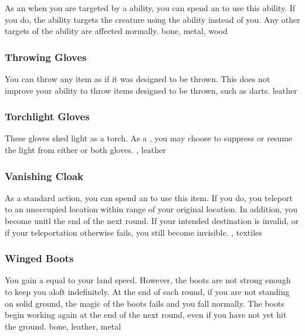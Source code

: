 As an  when you are targeted by a   ability, you can spend an  to use this ability.
If you do, the ability targets the creature using the ability instead of you.
Any other targets of the ability are affected normally.
 
 bone, metal, wood
\lowercase{\hypertarget{item:Throwing Gloves}{}}\label{item:Throwing Gloves}
\hypertarget{item:Throwing Gloves}{\subsubsection{Throwing Gloves\hfill{}}}
You can throw any item as if it was designed to be thrown.
This does not improve your ability to throw items designed to be thrown, such as darts.
 
 leather
\lowercase{\hypertarget{item:Torchlight Gloves}{}}\label{item:Torchlight Gloves}
\hypertarget{item:Torchlight Gloves}{\subsubsection{Torchlight Gloves\hfill{}}}
These gloves shed light as a torch.
As a , you may choose to suppress or resume the light from either or both gloves.
 , 
 leather
\lowercase{\hypertarget{item:Vanishing Cloak}{}}\label{item:Vanishing Cloak}
\hypertarget{item:Vanishing Cloak}{\subsubsection{Vanishing Cloak\hfill{}}}
As a standard action, you can spend an  to use this item.
If you do, you teleport to an unoccupied location within \rngmed range of your original location.
In addition, you become  unitl the end of the next round.
If your intended destination is invalid, or if your teleportation otherwise fails, you still become invisible.
 , 
 textiles
\lowercase{\hypertarget{item:Winged Boots}{}}\label{item:Winged Boots}
\hypertarget{item:Winged Boots}{\subsubsection{Winged Boots\hfill{}}}
You gain a  equal to your land speed.
However, the boots are not strong enough to keep you aloft indefinitely.
At the end of each round, if you are not standing on solid ground, the magic of the boots fails and you fall normally.
The boots begin working again at the end of the next round, even if you have not yet hit the ground.
 
 bone, leather, metal